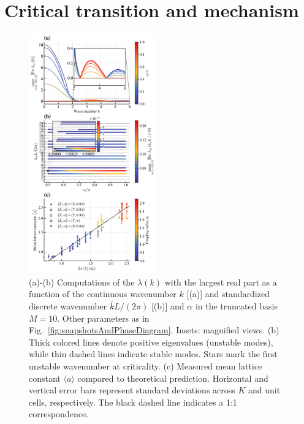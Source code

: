 \documentclass{article}
\begin{document}
\newpage

\section{\label{sec:mechanism}Critical transition and mechanism}

\begin{figure}
    \centering
    \includegraphics[width=0.49\textwidth]{./figs/eigenvaluesAndLatticeConstants.pdf}
    \caption{
        \label{fig:eigenvaluesAndLatticeConstants}
        (a)-(b) Computations of the $\lambda(k)$ with the largest real part as a function of the continuous wavenumber $k$ [(a)] and standardized discrete wavenumber $\bar{k}L/(2\pi)$ [(b)] and $\alpha$ in the truncated basis $M=10$. Other parameters as in Fig.~\ref{fig:snapshotsAndPhaseDiagram}. Insets: magnified views.
        (b) Thick colored lines denote positive eigenvalues (unstable modes), while thin dashed lines indicate stable modes. Stars mark the first unstable wavenumber at criticality. (c) Measured mean lattice constant $\langle a \rangle$ compared to theoretical prediction. Horizontal and vertical error bars represent standard deviations across $K$ and unit cells, respectively. The black dashed line indicates a 1:1 correspondence.
    }
\end{figure}
\end{document}
